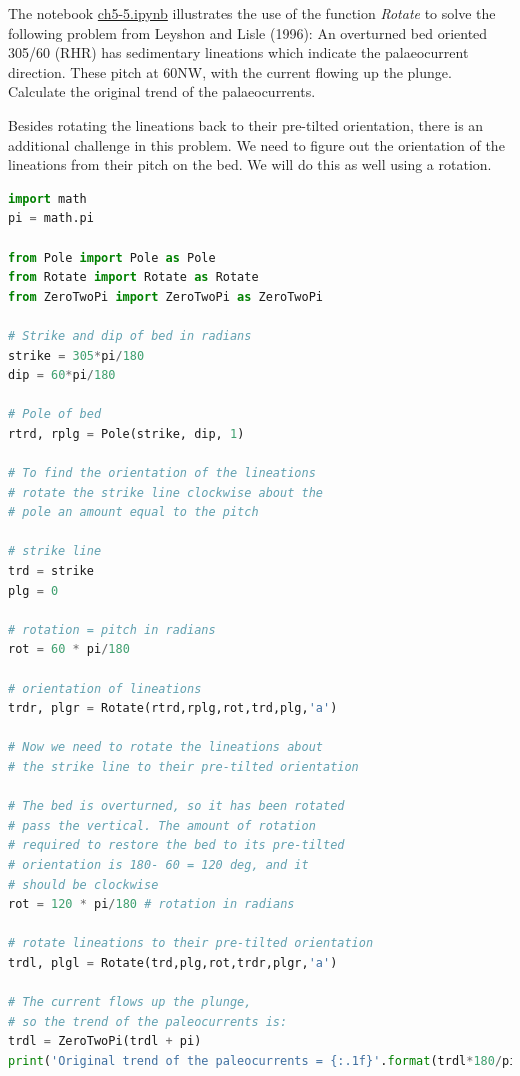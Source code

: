 \documentclass[a4paper , 12pt]{book}
\begin{document}
The  notebook  \href{http://github.com}{ch5-5.ipynb} illustrates  the  use  of  the  function \textit{Rotate} to solve the following problem from Leyshon  and Lisle  (1996): An overturned bed oriented 305/60 (RHR) has sedimentary lineations which indicate the palaeocurrent direction. These pitch at 60NW, with the current flowing up the plunge. Calculate the original trend of the palaeocurrents. 

Besides rotating the lineations back to their pre-tilted orientation, there is an additional challenge in this problem. We need to figure out the orientation of the lineations from their pitch on the bed. We will do this as well using a rotation.

\begin{center}
\begin{lstlisting}[language=Python, frame=single]
import math
pi = math.pi

from Pole import Pole as Pole
from Rotate import Rotate as Rotate
from ZeroTwoPi import ZeroTwoPi as ZeroTwoPi

# Strike and dip of bed in radians
strike = 305*pi/180
dip = 60*pi/180

# Pole of bed
rtrd, rplg = Pole(strike, dip, 1)

# To find the orientation of the lineations
# rotate the strike line clockwise about the 
# pole an amount equal to the pitch

# strike line
trd = strike 
plg = 0

# rotation = pitch in radians
rot = 60 * pi/180 

# orientation of lineations
trdr, plgr = Rotate(rtrd,rplg,rot,trd,plg,'a')

# Now we need to rotate the lineations about
# the strike line to their pre-tilted orientation

# The bed is overturned, so it has been rotated 
# pass the vertical. The amount of rotation
# required to restore the bed to its pre-tilted
# orientation is 180- 60 = 120 deg, and it
# should be clockwise
rot = 120 * pi/180 # rotation in radians

# rotate lineations to their pre-tilted orientation
trdl, plgl = Rotate(trd,plg,rot,trdr,plgr,'a')

# The current flows up the plunge, 
# so the trend of the paleocurrents is:
trdl = ZeroTwoPi(trdl + pi)
print('Original trend of the paleocurrents = {:.1f}'.format(trdl*180/pi))
\end{lstlisting}
\end{center}
\end{document}
